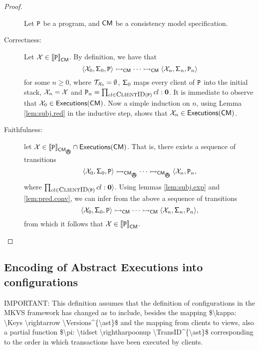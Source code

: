 \begin{proof}
\begin{description}
Let $\texttt{P}$ be a program, and $\mathsf{CM}$ be a consistency model specification.
\item[Correctness:] Let $\mathcal{X} \in {\llbracket \texttt{P}\rrbracket}_{\mathsf{CM}}$. By definition, we have that 
\[ 
\langle \mathcal{X}_0, \mathsf{\Sigma}_{0}, \texttt{P} \rangle \rightarrowtail_{\mathsf{CM}} \cdots \rightarrowtail_{\mathsf{CM}} \langle \mathcal{X}_{n}, \mathsf{\Sigma}_{n}, 
\texttt{P}_{n} \rangle 
\]
for some $n \geq 0$, where $\mathcal{T}_{\mathcal{X}_0} = \emptyset$, $\mathsf{\Sigma}_{0}$ maps every client of $\texttt{P}$ into the initial stack, 
$\mathcal{X}_n = \mathcal{X}$
and $\prog_{n} = \prod_{\tid \in \Clients(\prog)} \tid: \nil$. It is immediate to observe that 
$\mathcal{X}_0 \in {\mathsf{Executions}}(\mathsf{CM})$. Now a simple induction on $n$, using Lemma \ref{lem:subj.red} 
in the inductive step, shows that $\mathcal{X}_n \in {\mathsf{Executions}}(\mathsf{CM})$.
\item[Faithfulness:] let $\aexec \in \interpr{\prog}_{\CM_{\anarchicsmall}} \cap \aeset(\CM)$. 
That is, there exists a sequence of transitions 
\[
\langle \aexec_0, \thdstackFun_{0}, \prog \rangle \absrightarrow_{\CM_{\anarchicsmall}} \cdots \absrightarrow_{\CM_{\anarchicsmall}} \langle \aexec_{n}, \prog_n, 
\]
where $\prod_{\tid \in \Clients(\prog)} \tid: \nil \rangle$.
Using lemmas \ref{lem:subj.exp} and \ref{lem:pred.conv}, we can infer from the above a sequence of transitions
\[
\langle \mathcal{X}_0, \mathsf{\Sigma}_{0}, \texttt{P} \rangle \rightarrowtail_{\mathsf{CM}} \cdots \rightarrowtail_{\mathsf{CM}} \langle \mathcal{X}_{n}, \mathsf{\Sigma}_{n}, 
\texttt{P}_{n} \rangle,
\]
from which it follows that $\mathcal{X} \in {\llbracket \texttt{P}\rrbracket}_{\mathsf{CM}}$.
\end{description}
\end{proof}

\subsection{Encoding of Abstract Executions into configurations}
\ac{IMPORTANT: This definition assumes that the definition of configurations in the MKVS framework has changed as to include, besides 
the mapping $\kappa: \Keys \rightarrow \Versions^{\ast}$ and the mapping from clients to views, 
also a partial function $\pi: \tidset \rightharpoonup \TransID^{\ast}$ corresponding to the order 
in which transactions have been executed by clients.}

